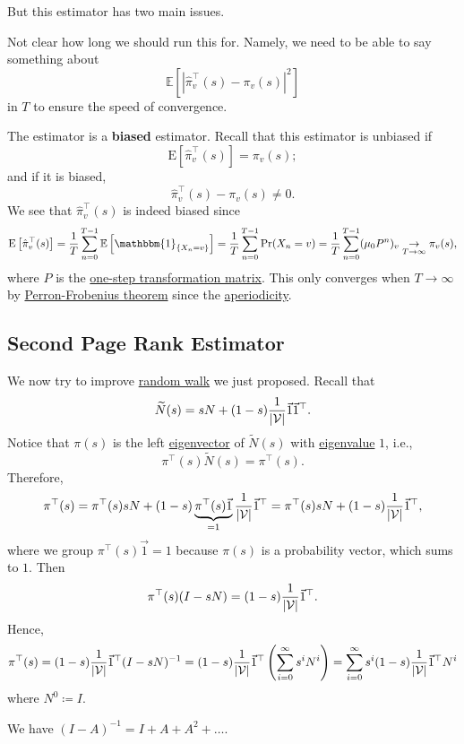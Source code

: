 But this estimator has two main issues.
\begin{problem}
Not clear how long we should run this for. Namely, we need to be able to say something about
\[
	\mathbb{E}\left[\left\vert \hat{\pi}^{\top}_v(s) - \pi_v(s) \right\vert^2 \right]
\]
in \(T\) to ensure the speed of convergence.
\end{problem}

\begin{problem}[Biased]
The estimator is a \textbf{biased} estimator. Recall that this estimator is unbiased if
\[
	\mathrm{E}\left[ \hat{\pi}_{v}^{\top}(s) \right] = \pi_v(s);
\]
and if it is biased,
\[
	\hat{\pi}_{v}^{\top}(s) - \pi_v(s)\neq 0.
\]
We see that \(\hat{\pi}^{\top}_v(s)\) is indeed biased since
\[
	\mathrm{E}\left[\hat{\pi}^{\top}_v(s)\right] = \frac{1}{T}\sum\limits_{n=0}^{T-1} \mathbb{E}\left[\mathbbm{1}_{\{X_n = v\}} \right]
	= \frac{1}{T}\sum\limits_{n=0}^{T-1} \Pr(X_n = v)
	= \frac{1}{T}\sum\limits_{n=0}^{T-1} (\mu_0 P^n)_v\underset{T\to \infty }{\to }\pi_v(s),
\]
where \(P\) is the \underline{one-step transformation matrix}. This only converges when \(T\to \infty \) by \hyperref[thm:Perron-Frobenius-theorem]{Perron-Frobenius theorem} since the \hyperref[def:aperiodic]{aperiodicity}.
\end{problem}

\subsection{Second Page Rank Estimator}\label{subsec:second-page-rank-estimator}
We now try to improve \hyperref[algo:random-walk-algorithm]{random walk} we just proposed. Recall that
\[
	\widetilde{N}(s) = sN+(1-s)\frac{1}{\left\vert \mathcal{\MakeUppercase{v}}  \right\vert }\vec{1}\vec{1}^{\top}.
\]
Notice that \(\pi(s)\) is the left \hyperref[def:eigenvector]{eigenvector} of \(\widetilde{N}(s)\) with \hyperref[def:eigenvalue]{eigenvalue} \(1\), i.e.,
\[
	\pi^{\top}(s)\widetilde{N}(s) = \pi^{\top}(s).
\]
Therefore,
\[
	\pi ^{\top} (s)
	= \pi^{\top}(s)sN+(1 - s)\underbrace{\pi^{\top}(s)\vec{1}}_{ = 1}\frac{1}{\left\vert \mathcal{\MakeUppercase{v}}\right\vert}\vec{1}^{\top}
	= \pi^{\top}(s)sN+(1 - s)\frac{1}{\left\vert \mathcal{\MakeUppercase{v}}  \right\vert}\vec{1}^{\top},
\]
where we group \(\pi^{\top}(s)\vec{1} = 1\) because \(\pi(s)\) is a probability vector, which sums to \(1\). Then
\[
	\pi^{\top}(s)(I - sN) = (1 - s)\frac{1}{\left\vert \mathcal{\MakeUppercase{v}}  \right\vert}\vec{1}^{\top}.
\]
Hence,
\[
	\pi^{\top}(s) = (1 - s)\frac{1}{\left\vert \mathcal{\MakeUppercase{v}}  \right\vert}\vec{1}^{\top}(I - sN)^{-1}
	= (1 - s)\frac{1}{\left\vert \mathcal{\MakeUppercase{v}}  \right\vert}\vec{1}^{\top}\left(\sum\limits_{i=0}^{\infty} s^i N^i\right)
	= \sum\limits_{i=0}^{\infty} s^i (1 - s)\frac{1}{\left\vert \mathcal{\MakeUppercase{v}}  \right\vert}\vec{1}^{\top}N^i
\]
where \(N^0\coloneqq I\).
\begin{prev}
	We have \((I - A)^{-1} = I + A + A^2 + \ldots\).
\end{prev}

